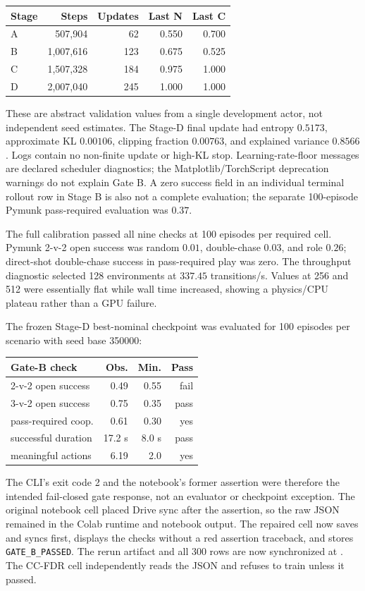 \documentclass[12pt,twocolumn]{article}
\begin{document}
\begin{center}
\scriptsize
\begin{tabular}{lrrrr}
\toprule Stage & Steps & Updates & Last N & Last C \\
\midrule
A & 507,904 & 62 & 0.550 & 0.700 \\
B & 1,007,616 & 123 & 0.675 & 0.525 \\
C & 1,507,328 & 184 & 0.975 & 1.000 \\
D & 2,007,040 & 245 & 1.000 & 1.000 \\
\bottomrule
\end{tabular}
\normalsize
\end{center}
These are abstract validation values from a single development actor, not independent seed
estimates. The Stage-D final update had entropy $0.5173$, approximate KL $0.00106$, clipping
fraction $0.00763$, and explained variance $0.8566$. Logs contain no non-finite update or high-KL
stop. Learning-rate-floor messages are declared scheduler diagnostics; the Matplotlib/TorchScript
deprecation warnings do not explain Gate B. A zero success field in an individual terminal
rollout row in Stage B is also not a complete evaluation; the separate 100-episode Pymunk
pass-required evaluation was $0.37$.

The full calibration passed all nine checks at 100 episodes per required cell. Pymunk 2-v-2 open
success was random $0.01$, double-chase $0.03$, and role $0.26$; direct-shot double-chase success
in pass-required play was zero. The throughput diagnostic selected 128 environments at $337.45$
transitions/s. Values at 256 and 512 were essentially flat while wall time increased, showing a
physics/CPU plateau rather than a GPU failure.

The frozen Stage-D best-nominal checkpoint was evaluated for 100 episodes per scenario with seed
base 350000:
\begin{center}
\scriptsize
\begin{tabular}{lrrr}
\toprule Gate-B check & Obs. & Min. & Pass \\
\midrule
2-v-2 open success & 0.49 & 0.55 & fail \\
3-v-2 open success & 0.75 & 0.35 & pass \\
pass-required coop. & 0.61 & 0.30 & yes \\
successful duration & 17.2 s & 8.0 s & pass \\
meaningful actions & 6.19 & 2.0 & yes \\
\bottomrule
\end{tabular}
\normalsize
\end{center}
The CLI's exit code 2 and the notebook's former assertion were therefore the intended fail-closed
gate response, not an evaluator or checkpoint exception. The original notebook cell placed Drive
sync after the assertion, so the raw JSON remained in the Colab runtime and notebook output. The
repaired cell now saves and syncs first, displays the checks without a red assertion traceback,
and stores \texttt{GATE\_B\_PASSED}. The rerun artifact and all 300 rows are now synchronized at
.
The CC-FDR cell independently reads the JSON and refuses to train unless it passed.
\end{document}
